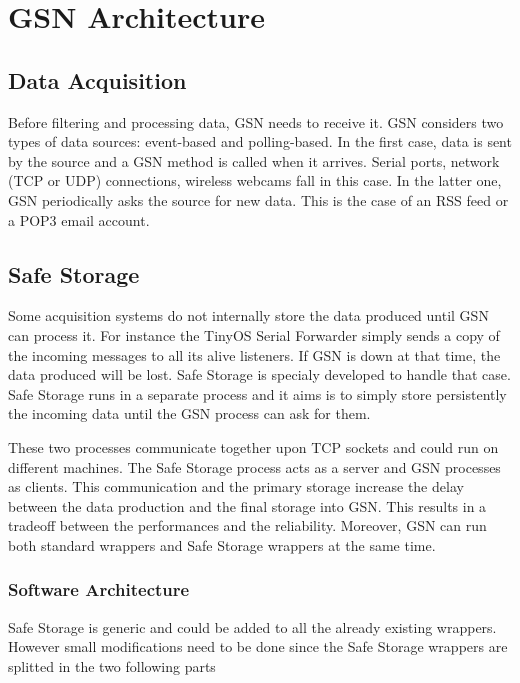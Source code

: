\graphicspath{{chapters/ch-architecture/figures/}}

\chapter{GSN Architecture}

\section{Data Acquisition}

 Before filtering and processing data, GSN needs to receive it. GSN considers two types of data sources: event-based and polling-based.
 In the first case, data is sent by the source and a GSN method is called when it arrives.
 Serial ports, network (TCP or UDP) connections, wireless webcams fall in this case. In the latter one, GSN periodically asks the 
 source for new data. This is the case of an RSS feed or a POP3 email account.

\section{Safe Storage \label{safe_storage}}

Some acquisition systems do not internally store the data produced until GSN can process it. For instance 
the TinyOS Serial Forwarder simply sends a copy of the incoming messages to all its alive listeners. If GSN is down 
at that time, the data produced will be lost. Safe Storage is specialy developed to handle that case.
Safe Storage runs in a separate process and it aims is to simply store persistently the incoming data until the GSN process can ask for them.

These two processes communicate together upon TCP sockets and could run on different machines. The Safe Storage process acts as 
a server and GSN processes as clients. This communication and the primary storage increase the delay between the data production and the 
final storage into GSN. This results in a tradeoff between the performances and the reliability.
Moreover, GSN can run both standard wrappers and Safe Storage wrappers at the same time.

\subsection{Software Architecture}

Safe Storage is generic and could be added to all the already existing wrappers.
However small modifications need to be done since the Safe Storage wrappers are splitted in the two following parts

